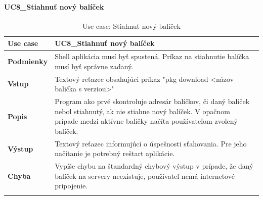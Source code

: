 \paragraph{UC8\_Stiahnuť nový balíček}
\begin{center}
	\begin{longtable}{|p{2.5cm}|p{12.2cm}|}
			\hline
			\textbf{Use case} & UC8\_Stiahnuť nový balíček \\ 
			\hline
			\textbf{Podmienky} & Shell aplikácia musí byť spustená. Príkaz na stiahnutie balíčka musí byť správne zadaný.\\ 
			\hline
			\textbf{Vstup} & Textový reťazec obsahujúci príkaz "pkg download <názov balička s verziou>"\\
			\hline
			\textbf{Popis} & Program ako prvé skontroluje adresár balíčkov, či daný balíček nebol stiahnutý, ak nie stiahne nový balíček. V opačnom prípade medzi aktívne balíčky načíta používateľom zvolený balíček.\\ 
			\hline
			\textbf{Výstup} & Textový reťazec  informujúci o úspešnosti sťahovania. Pre jeho načítanie je potrebný reštart aplikácie.\\
			\hline

			\textbf{Chyba} & Vypíše chybu na štandardný chybový výstup v prípade, že daný balíček na servery neexistuje, používateľ nemá internetové pripojenie.\\
			\hline
		\caption{Use case: Stiahnuť nový balíček}
		\label{table:1}
		
	\end{longtable}
\end{center}

